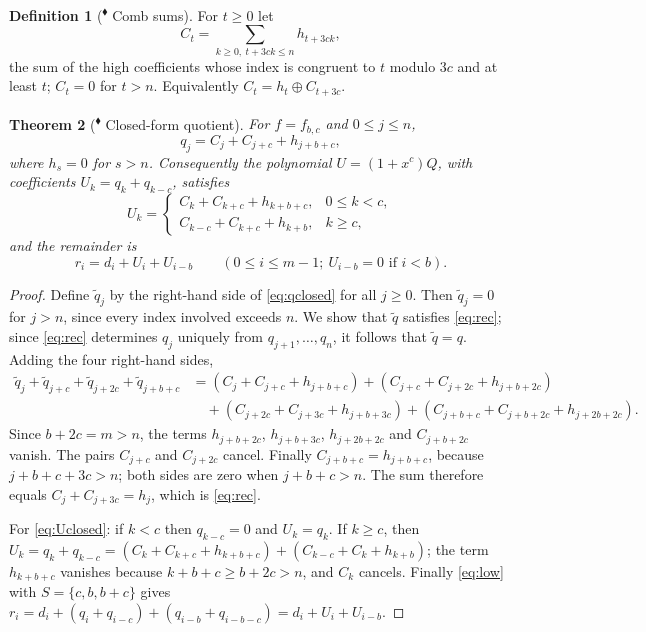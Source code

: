 \documentclass[11pt,a4paper]{article}
\theoremstyle{plain}
\newtheorem{theorem}{Theorem}
\theoremstyle{definition}
\newtheorem{definition}[theorem]{Definition}
\newcommand{\xor}{\oplus}
\newcommand{\ours}{\textsuperscript{\textcolor{cblue}{$\blacklozenge$}}}
\begin{document}
\begin{definition}[\ours{} Comb sums]
For $t\ge0$ let
\[
  C_t=\sum_{k\ge0,\ t+3ck\le n} h_{t+3ck},
\]
the sum of the high coefficients whose index is congruent to $t$ modulo $3c$ and at
least $t$; $C_t=0$ for $t>n$. Equivalently $C_t=h_t\xor C_{t+3c}$.
\end{definition}

\begin{theorem}[\ours{} Closed-form quotient]\label{thm:quotient}
For $f=f_{b,c}$ and $0\le j\le n$,
\begin{equation}\label{eq:qclosed}
  q_j=C_j+C_{j+c}+h_{j+b+c},
\end{equation}
where $h_s=0$ for $s>n$. Consequently the polynomial $U=(1+x^c)Q$, with coefficients
$U_k=q_k+q_{k-c}$, satisfies
\begin{equation}\label{eq:Uclosed}
  U_k=\begin{cases}
    C_k+C_{k+c}+h_{k+b+c}, & 0\le k<c,\\[2pt]
    C_{k-c}+C_{k+c}+h_{k+b}, & k\ge c,
  \end{cases}
\end{equation}
and the remainder is
\begin{equation}\label{eq:rU}
  r_i=d_i+U_i+U_{i-b}\qquad(0\le i\le m-1;\ U_{i-b}=0 \text{ if } i<b).
\end{equation}
\end{theorem}

\begin{proof}
Define $\tilde q_j$ by the right-hand side of \eqref{eq:qclosed} for all $j\ge0$. Then
$\tilde q_j=0$ for $j>n$, since every index involved exceeds $n$. We show that
$\tilde q$ satisfies \eqref{eq:rec}; since \eqref{eq:rec} determines $q_j$ uniquely from
$q_{j+1},\dots,q_n$, it follows that $\tilde q=q$. Adding the four right-hand sides,
\begin{align*}
\tilde q_j+\tilde q_{j+c}+\tilde q_{j+2c}+\tilde q_{j+b+c}
 &=(C_j+C_{j+c}+h_{j+b+c})+(C_{j+c}+C_{j+2c}+h_{j+b+2c})\\
 &\quad+(C_{j+2c}+C_{j+3c}+h_{j+b+3c})+(C_{j+b+c}+C_{j+b+2c}+h_{j+2b+2c}).
\end{align*}
Since $b+2c=m>n$, the terms $h_{j+b+2c}$, $h_{j+b+3c}$, $h_{j+2b+2c}$ and
$C_{j+b+2c}$ vanish. The pairs $C_{j+c}$ and $C_{j+2c}$ cancel. Finally
$C_{j+b+c}=h_{j+b+c}$, because $j+b+c+3c>n$; both sides are zero when $j+b+c>n$. The sum
therefore equals $C_j+C_{j+3c}=h_j$, which is \eqref{eq:rec}.

For \eqref{eq:Uclosed}: if $k<c$ then $q_{k-c}=0$ and $U_k=q_k$. If $k\ge c$, then
$U_k=q_k+q_{k-c}=(C_k+C_{k+c}+h_{k+b+c})+(C_{k-c}+C_k+h_{k+b})$; the term $h_{k+b+c}$
vanishes because $k+b+c\ge b+2c>n$, and $C_k$ cancels. Finally \eqref{eq:low} with
$S=\{c,b,b+c\}$ gives
$r_i=d_i+(q_i+q_{i-c})+(q_{i-b}+q_{i-b-c})=d_i+U_i+U_{i-b}$.
\end{proof}
\end{document}
